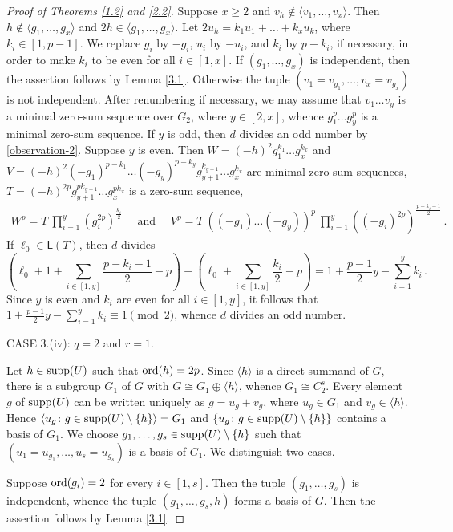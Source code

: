 \documentclass[a4paper,10pt]{amsart}
\theoremstyle{plain}
\theoremstyle{definition}
\numberwithin{equation}{section}
\begin{document}
\begin{proof}[Proof of Theorems \ref{1.2} and \ref{2.2}]
Suppose $x\ge 2$ and $v_h\not\in \langle v_1, \ldots, v_x \rangle $. Then $h\not\in \langle g_1,\ldots, g_x\rangle$ and $2h\in \langle g_1,\ldots, g_x\rangle$. Let $2u_h=k_1u_1+\ldots +k_xu_k$, where $k_i\in [1,p-1]$. We replace $g_i$ by $-g_i$, $u_i$ by $-u_i$, and $k_i$ by $p-k_i$, if necessary,  in order to make $k_i$ to be  even for all $i\in [1,x]$. If $(g_1, \ldots, g_x)$ is independent, then the assertion follows by Lemma \ref{3.1}.
Otherwise the tuple $(v_1=v_{g_1}, \ldots, v_x=v_{g_x})$ is not independent.  After renumbering if necessary, we may assume that $v_1\ldots v_y$ is a minimal zero-sum sequence over $G_2$, where $y\in [2, x]$, whence $g_1^p\ldots g_y^p$ is a minimal zero-sum sequence. If $y$ is odd, then $d$ divides an odd number by \eqref{observation-2}. Suppose $y$ is even. Then $W=(-h)^2g_1^{k_1}\ldots g_x^{k_x}$  and  $V=(-h)^2(-g_1)^{p-k_1}\ldots (-g_y)^{p-k_y}g_{y+1}^{k_{y+1}}\ldots g_x^{k_x}$ are  minimal zero-sum sequences, $T=(-h)^{2p}g_{y+1}^{pk_{y+1}}\ldots g_x^{pk_x}$  is a zero-sum sequence,
\begin{align*}
W^p=T \  \prod_{i=1}^y (g_i^{2p})^{\frac{k_i}{2}} \quad \text{ and } \quad V^p=T \ ((-g_1)\ldots (-g_y))^p\  \prod_{i=1}^y((-g_i)^{2p})^{\frac{p-k_i-1}{2}}\,.
\end{align*}
If $\ell_0\in \mathsf L(T)$, then $d$ divides
\[
\left(\ell_0+1+\sum_{i\in [1,y]}\frac{p-k_i-1}{2}-p\right)-\left(\ell_0+\sum_{i\in [1,y]}\frac{k_i}{2}-p\right)    =1+\frac{p-1}{2}y-\sum_{i=1}^yk_i\,.
\]
Since $y$ is even and $k_i$ are even for all $i\in [1,y]$, it follows that $1+\frac{p-1}{2}y-\sum_{i=1}^yk_i\equiv 1\pmod 2$, whence $d$ divides an odd number.


\medskip
\noindent
CASE 3.(iv):  $q=2$ and $r=1$.


Let $h\in \operatorname{supp}(U)$ such that $\operatorname{ord}(h)=2p$.  Since $\langle h\rangle $ is a direct summand of $G$, there is a subgroup $G_1$ of $G$ with $G\cong G_1\oplus \langle h\rangle$, whence $G_1\cong C_2^s$. Every element $g$ of $\operatorname{supp}(U)$ can be written uniquely as $g=u_g+v_g$, where $u_g\in G_1$ and $v_g\in \langle h \rangle$. Hence $\langle u_g\colon g\in \operatorname{supp}(U)\setminus \{h\}\rangle=G_1$ and $\{u_g\colon  g\in \operatorname{supp}(U)\setminus \{h\}\}$ contains a basis of $G_1$. We choose $g_1, \ldots, g_s\in \operatorname{supp}(U)\setminus\{h\}$ such that $(u_1=u_{g_1}, \ldots, u_{s}=u_{g_{s}})$ is a basis of $G_1$. We distinguish two cases.


Suppose $\operatorname{ord}(g_i)=2$ for every $i\in [1, s]$.  Then the tuple $(g_1, \ldots, g_{s})$ is independent, whence the tuple $(g_1, \ldots, g_{s}, h)$ forms a basis of $G$. Then the assertion follows by Lemma \ref{3.1}.




\end{proof}
\end{document}
